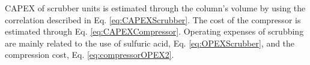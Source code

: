 \begin{refsection}[referencesCh6]
%

CAPEX of scrubber units is estimated through the column's volume by using the correlation described in Eq. \ref{eq:CAPEXScrubber}. The cost of the compressor is estimated through Eq. \ref{eq:CAPEXCompressor}.
Operating expenses of scrubbing are mainly related to the use of sulfuric acid, Eq. \ref{eq:OPEXScrubber}, and the compression cost, Eq. \ref{eq:compressorOPEX2}.


\end{refsection}
